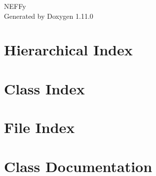 \documentclass[twoside]{book}
\newcommand{\+}{\discretionary{\mbox{\scriptsize$\hookleftarrow$}}{}{}}
\newcommand{\clearemptydoublepage}{%
    \newpage{\pagestyle{empty}\cleardoublepage}%
  }
\begin{document}
  \raggedbottom
    \hypersetup{pageanchor=false,
                bookmarksnumbered=true,
                pdfencoding=unicode
               }
  \begin{titlepage}
  \vspace*{7cm}
  \begin{center}%
  {\Large NEFFy}\\
  \vspace*{1cm}
  {\large Generated by Doxygen 1.11.0}\\
  \end{center}
  \end{titlepage}
  \clearemptydoublepage
  \tableofcontents
  \clearemptydoublepage
  \hypersetup{pageanchor=true}








\chapter{Hierarchical Index}

\chapter{Class Index}

\chapter{File Index}

\chapter{Class Documentation}




















\end{document}
